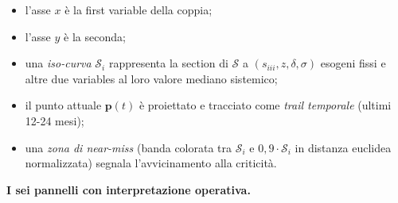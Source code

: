 \begin{itemize}
\tightlist
\item
  l'asse \(x\) è la first variable della coppia;
\item
  l'asse \(y\) è la seconda;
\item
  una \emph{iso-curva} \(\mathcal{S}_i\) rappresenta la section di
  \(\mathcal{S}\) a \((s_{iii}, z, \delta, \sigma)\) esogeni fissi e
  altre due variables al loro valore mediano sistemico;
\item
  il punto attuale \(\boldsymbol{p}(t)\) è proiettato e tracciato come
  \emph{trail temporale} (ultimi 12-24 mesi);
\item
  una \emph{zona di near-miss} (banda colorata tra \(\mathcal{S}_i\) e
  \(0{,}9 \cdot \mathcal{S}_i\) in distanza euclidea normalizzata)
  segnala l'avvicinamento alla criticità.
\end{itemize}

\Proved{} \textbf{I sei pannelli con interpretazione operativa.}

